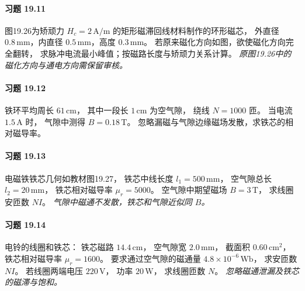 \paragraph{习题 19.11}
图19.26为矫顽力 \(H_c=2\,\mathrm{A/m}\)
的矩形磁滞回线材料制作的环形磁芯，
外直径 \(0.8\,\mathrm{mm}\)，内直径
\(0.5\,\mathrm{mm}\)，高度 \(0.3\,\mathrm{mm}\)。
若原来磁化方向如图，欲使磁化方向完全翻转，
求脉冲电流最小峰值；按磁路长度与矫顽力关系计算。
\textit{原图19.26中的磁化方向与通电方向需保留审核。}

\paragraph{习题 19.12}
铁环平均周长 \(61\,\mathrm{cm}\)，
其中一段长 \(1\,\mathrm{cm}\) 为空气隙，
绕线 \(N=1000\) 匝。
当电流 \(1.5\,\mathrm A\) 时，
气隙中测得 \(B=0.18\,\mathrm T\)。
忽略漏磁与气隙边缘磁场发散，求铁芯的相对磁导率。

\paragraph{习题 19.13}
电磁铁铁芯几何如教材图19.27，
铁芯中线长度 \(l_1=500\,\mathrm{mm}\)，
空气隙总长 \(l_2=20\,\mathrm{mm}\)，
铁芯相对磁导率 \(\mu_r=5000\)。
空气隙中期望磁场 \(B=3\,\mathrm T\)，
求线圈安匝数 \(NI\)。
\textit{气隙中磁通不发散，铁芯和气隙近似同 \(B\)。}

\paragraph{习题 19.14}
电铃的线圈和铁芯：
铁芯磁路 \(14.4\,\mathrm{cm}\)，
空气隙宽 \(2.0\,\mathrm{mm}\)，
截面积 \(0.60\,\mathrm{cm^2}\)，
铁芯相对磁导率 \(\mu_r=1600\)。
要求通过空气隙的磁通量 \(4.8\times10^{-6}\,\mathrm{Wb}\)，
求安匝数 \(NI\)。
若线圈两端电压 \(220\,\mathrm V\)，
功率 \(20\,\mathrm W\)，
求线圈匝数 \(N\)。
\textit{忽略磁通泄漏及铁芯的磁滞与饱和。}
